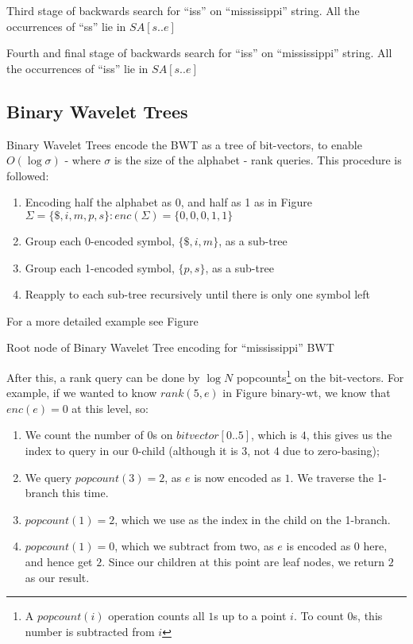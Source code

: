 			{Third stage of backwards search for ``iss'' on ``mississippi'' 
			string. All the occurrences of ``ss'' lie in $SA[s..e]$}

			{Fourth and final stage of backwards search for ``iss'' on
			``mississippi'' string. All the occurrences of ``iss'' lie in
			$SA[s..e]$}
		\newpage


\subsection{Binary Wavelet Trees}
Binary Wavelet Trees encode the BWT as a tree of bit-vectors, to enable
$O(\log \sigma)$ - where $\sigma$ is the size of the alphabet - rank queries. This procedure is followed:

\begin{enumerate}
    \item
		Encoding half the alphabet as 0, and half as 1 as in Figure
    	$\Sigma = \{ \$, i, m, p, s \} : enc(\Sigma) = \{ 0, 0, 0, 1, 1 \}$
    \item
		Group each 0-encoded symbol, $\{ \$, i, m \}$, as a sub-tree
    \item
		Group each 1-encoded symbol, $\{ p, s \}$, as a sub-tree
    \item
		Reapply to each sub-tree recursively until there is only one symbol
    	left
\end{enumerate}

For a more detailed example see Figure %


			{Root node of Binary Wavelet Tree encoding for ``mississippi'' BWT}


After this, a rank query can be done by $\log N$ popcounts\footnote{A
$popcount(i)$ operation counts all $1$s up to a point $i$. To count $0$s, this
number is subtracted from $i$} on the bit-vectors. For example, if we wanted to 
know $rank(5, e)$ in Figure binary-wt, we know that $enc(e) = 0$ at this level, so:

\begin{enumerate}
    \item
		We count the number of $0$s on $bitvector[0..5]$, which is $4$, this
   		gives us the index to query in our 0-child (although it is $3$, not $4$ 
		due to zero-basing);
    \item
		We query $popcount(3) = 2$, as $e$ is now encoded as $1$. We traverse
    	the 1-branch this time.
    \item
		$popcount(1) = 2$, which we use as the index in the child on the
    	1-branch.
    \item
		$popcount(1) = 0$, which we subtract from two, as $e$ is encoded as
    	$0$ here, and hence get $2$. Since our children at this point are leaf
    	nodes, we return $2$ as our result.
\end{enumerate}

